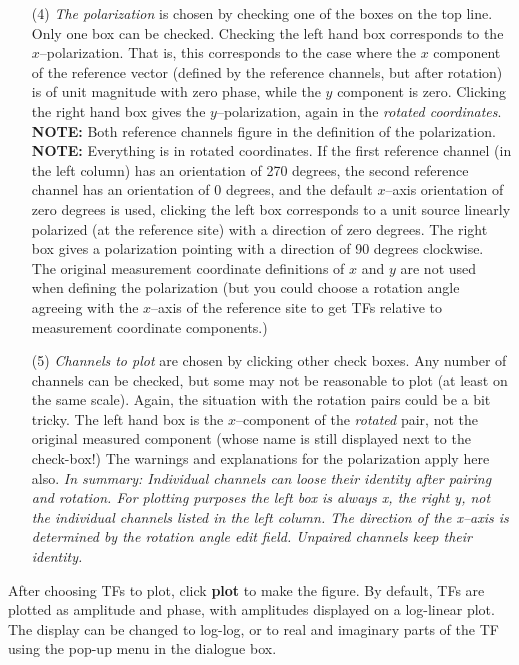 \begin{itemize}
\item[(4)]
{\it The polarization} is chosen by checking one of the boxes on the top line.
Only one box can be checked.  Checking the left hand box corresponds to
the $x$--polarization.  That is, this corresponds to the case where the
$x$ component of the reference vector (defined by the reference channels,
but after rotation) is of unit magnitude with zero phase, while the $y$
component is zero.  Clicking the right hand
box gives the $y$--polarization, again in the {\it rotated coordinates}.
{\bf NOTE:} Both reference channels figure in the definition
of the polarization.  {\bf NOTE:}  Everything is in rotated coordinates.
If the first reference channel (in the left column)
has an orientation of 270 degrees, the second
reference channel has an orientation of 0 degrees, and the default
$x$--axis orientation of zero degrees is used, clicking the left box
corresponds to a unit source linearly polarized (at the reference site)
with a direction of zero degrees.  The right box gives a polarization pointing
with a direction of 90 degrees clockwise.  The original measurement coordinate
definitions of $x$ and $y$ are not used when defining the polarization
(but you could choose a rotation angle agreeing with the $x$--axis of the
reference site to get TFs relative to measurement coordinate components.)

\item[(5)]
{\it Channels to plot} are chosen by clicking other check boxes.  Any
number of channels can be checked, but some may not
be reasonable to plot (at least on the same scale).  
Again, the situation with the rotation pairs could be
a bit tricky.  The left hand box is the $x$--component of the {\it rotated}
pair, not the original measured component (whose name is still displayed
next to the check-box!)  The warnings and explanations for the polarization
apply here also.  {\it In summary:
Individual channels can loose their identity after pairing and rotation.
For plotting purposes the left box is always x, the right y, not the
individual channels listed in the left column.  The direction
of the x--axis is determined by the rotation angle edit field.
Unpaired channels keep their identity.}
\end{itemize}

After choosing TFs to plot, click {\bf plot} to make the figure.
By default, TFs are plotted as amplitude and phase, with amplitudes
displayed on a log-linear plot.  The display can be changed to log-log,
or to real and imaginary parts of the TF using the pop-up menu in the dialogue
box.

